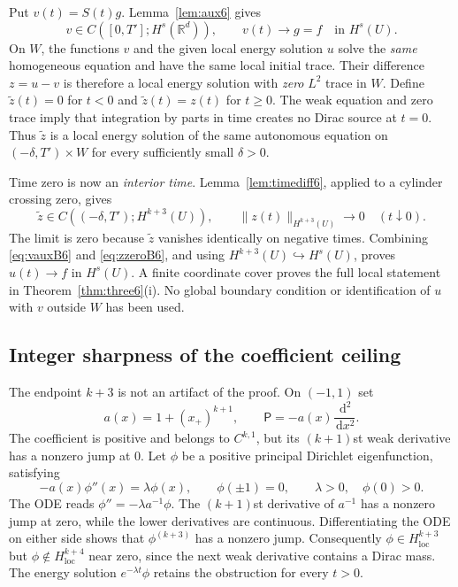 \documentclass[11pt,a4paper]{article}
\theoremstyle{definition}\newtheorem{definition}{Definition}[section]\newtheorem{example}[theorem]{Example}
\theoremstyle{remark}\newtheorem{remark}[theorem]{Remark}\newtheorem{remarkSix}{Remark}[section]
\newcommand{\Rd}{\mathbb R^d}
\newcommand{\loc}{\mathrm{loc}}
\newcommand{\dd}{\,\mathrm d}
\newcommand{\norm}[1]{\lVert #1\rVert}
\begin{document}
Put $v(t)=S(t)g$. Lemma~\ref{lem:aux6} gives
\begin{equation}\label{eq:vauxB6}
 v\in C([0,T'];H^s(\Rd)),\qquad
 v(t)\longrightarrow g=f\quad\text{in }H^s(U).
\end{equation}
On $W$, the functions $v$ and the given local energy solution $u$ solve the \emph{same} homogeneous equation and have the same local initial trace. Their difference $z=u-v$ is therefore a local energy solution with \emph{zero} $L^2$ trace in $W$. Define $\widetilde z(t)=0$ for $t<0$ and $\widetilde z(t)=z(t)$ for $t\ge0$. The weak equation and zero trace imply that integration by parts in time creates no Dirac source at $t=0$. Thus $\widetilde z$ is a local energy solution of the same autonomous equation on $(-\delta,T')\times W$ for every sufficiently small $\delta>0$.

Time zero is now an \emph{interior time}. Lemma~\ref{lem:timediff6}, applied to a cylinder crossing zero, gives
\begin{equation}\label{eq:zzeroB6}
 \widetilde z\in C((-\delta,T');H^{k+3}(U)),\qquad
 \norm{z(t)}_{H^{k+3}(U)}\longrightarrow0\quad(t\downarrow0).
\end{equation}
The limit is zero because $\widetilde z$ vanishes identically on negative times. Combining \eqref{eq:vauxB6} and \eqref{eq:zzeroB6}, and using $H^{k+3}(U)\hookrightarrow H^s(U)$, proves $u(t)\to f$ in $H^s(U)$. A finite coordinate cover proves the full local statement in Theorem~\ref{thm:three6}(i). No global boundary condition or identification of $u$ with $v$ outside $W$ has been used.

\subsection{Integer sharpness of the coefficient ceiling}
\label{subsec:sharp6}
The endpoint $k+3$ is not an artifact of the proof. On $(-1,1)$ set
\begin{equation}\label{eq:sharpcoefB6}
 a(x)=1+(x_+)^{k+1},\qquad
 \mathsf P=-a(x)\frac{\dd^2}{\dd x^2}.
\end{equation}
The coefficient is positive and belongs to $C^{k,1}$, but its $(k+1)$st weak derivative has a nonzero jump at $0$. Let $\phi$ be a positive principal Dirichlet eigenfunction, satisfying
\[
 -a(x)\phi''(x)=\lambda\phi(x),\qquad \phi(\pm1)=0,
 \qquad\lambda>0,\quad\phi(0)>0.
\]
The ODE reads $\phi''=-\lambda a^{-1}\phi$. The $(k+1)$st derivative of $a^{-1}$ has a nonzero jump at zero, while the lower derivatives are continuous. Differentiating the ODE on either side shows that $\phi^{(k+3)}$ has a nonzero jump. Consequently $\phi\in H^{k+3}_{\loc}$ but $\phi\notin H^{k+4}_{\loc}$ near zero, since the next weak derivative contains a Dirac mass. The energy solution $e^{-\lambda t}\phi$ retains the obstruction for every $t>0$.
\end{document}
